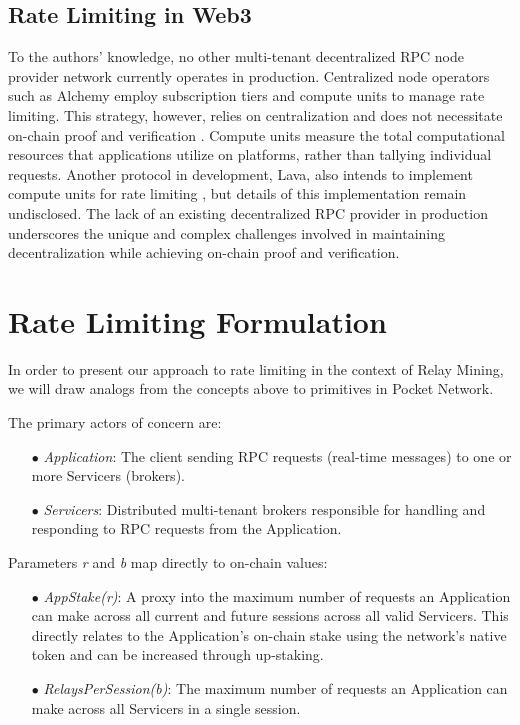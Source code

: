 \documentclass[runningheads]{llncs}
\begin{document}
\subsection{Rate Limiting in Web3}

To the authors' knowledge, no other multi-tenant decentralized RPC node provider network currently operates in production. Centralized node operators such as Alchemy employ subscription tiers and compute units to manage rate limiting. This strategy, however, relies on centralization and does not necessitate on-chain proof and verification \cite{alchemyComputeUnits}. Compute units measure the total computational resources that applications utilize on platforms, rather than tallying individual requests. Another protocol in development, Lava, also intends to implement compute units for rate limiting \cite{lava2022}, but details of this implementation remain undisclosed. The lack of an existing decentralized RPC provider in production underscores the unique and complex challenges involved in maintaining decentralization while achieving on-chain proof and verification.

\section{Rate Limiting Formulation}\label{rate-limiting-formulation}

In order to present our approach to rate limiting in the context of Relay Mining, we will draw analogs from the concepts above to primitives in Pocket Network.

The primary actors of concern are:
\begin{itemize}
  \item[$\bullet$] \textit{Application}: The client sending RPC requests (real-time messages) to one or more Servicers (brokers).
  \item[$\bullet$] \textit{Servicers}: Distributed multi-tenant brokers responsible for handling and responding to RPC requests from the Application.
\end{itemize}

Parameters \textit{r} and \textit{b} map directly to on-chain values:
\begin{itemize}
  \item[$\bullet$] \textit{AppStake(r)}: A proxy into the maximum number of requests an Application can make across all current and future sessions across all valid Servicers. This directly relates to the Application's on-chain stake using the network's native token and can be increased through up-staking.
  \item[$\bullet$] \textit{RelaysPerSession(b)}: The maximum number of requests an Application can make across all Servicers in a single session.
\end{itemize}
\end{document}
